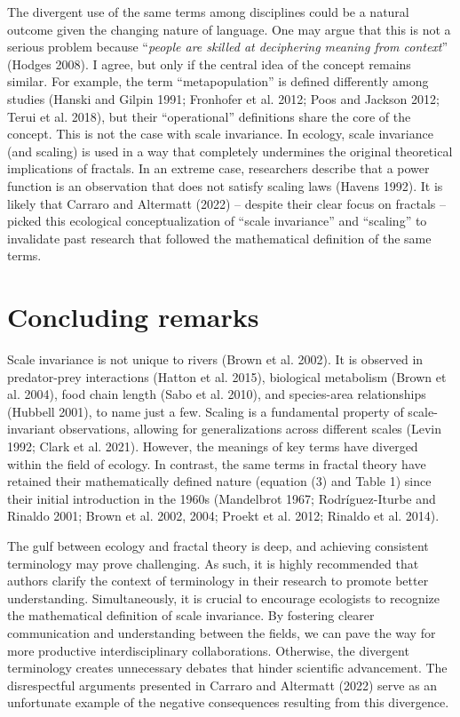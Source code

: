 \documentclass[
  12pt,
]{article}
\begin{document}
The divergent use of the same terms among disciplines could be a natural outcome given the changing nature of language. One may argue that this is not a serious problem because ``\emph{people are skilled at deciphering meaning from context}'' (Hodges 2008). I agree, but only if the central idea of the concept remains similar. For example, the term ``metapopulation'' is defined differently among studies (Hanski and Gilpin 1991; Fronhofer et al. 2012; Poos and Jackson 2012; Terui et al. 2018), but their ``operational'' definitions share the core of the concept. This is not the case with scale invariance. In ecology, scale invariance (and scaling) is used in a way that completely undermines the original theoretical implications of fractals. In an extreme case, researchers describe that a power function is an observation that does not satisfy scaling laws (Havens 1992). It is likely that Carraro and Altermatt (2022) -- despite their clear focus on fractals -- picked this ecological conceptualization of ``scale invariance'' and ``scaling'' to invalidate past research that followed the mathematical definition of the same terms.

\hypertarget{concluding-remarks}{%
\section{Concluding remarks}\label{concluding-remarks}}

Scale invariance is not unique to rivers (Brown et al. 2002). It is observed in predator-prey interactions (Hatton et al. 2015), biological metabolism (Brown et al. 2004), food chain length (Sabo et al. 2010), and species-area relationships (Hubbell 2001), to name just a few. Scaling is a fundamental property of scale-invariant observations, allowing for generalizations across different scales (Levin 1992; Clark et al. 2021). However, the meanings of key terms have diverged within the field of ecology. In contrast, the same terms in fractal theory have retained their mathematically defined nature (equation (3) and Table 1) since their initial introduction in the 1960s (Mandelbrot 1967; Rodríguez-Iturbe and Rinaldo 2001; Brown et al. 2002, 2004; Proekt et al. 2012; Rinaldo et al. 2014).

The gulf between ecology and fractal theory is deep, and achieving consistent terminology may prove challenging. As such, it is highly recommended that authors clarify the context of terminology in their research to promote better understanding. Simultaneously, it is crucial to encourage ecologists to recognize the mathematical definition of scale invariance. By fostering clearer communication and understanding between the fields, we can pave the way for more productive interdisciplinary collaborations. Otherwise, the divergent terminology creates unnecessary debates that hinder scientific advancement. The disrespectful arguments presented in Carraro and Altermatt (2022) serve as an unfortunate example of the negative consequences resulting from this divergence.
\end{document}

